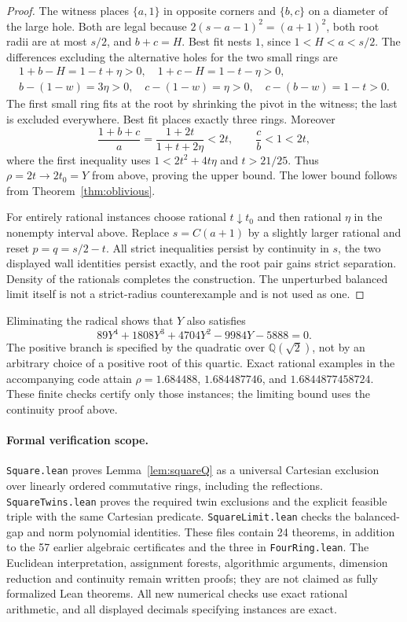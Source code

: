 \begin{proof}
The witness places $\{a,1\}$ in opposite corners and $\{b,c\}$
on a diameter of the large hole. Both are legal because
$2(s-a-1)^2=(a+1)^2$, both root radii are at most $s/2$, and
$b+c=H$. Best fit nests $1$, since $1<H<a<s/2$.
The differences excluding the alternative holes for the two
small rings are
\begin{gather*}
 1+b-H=1-t+\eta>0,\quad 1+c-H=1-t-\eta>0,\\
 b-(1-w)=3\eta>0,\quad c-(1-w)=\eta>0,\quad
 c-(b-w)=1-t>0.
\end{gather*}
The first small ring fits at the root by shrinking the pivot in
the witness; the last is excluded everywhere. Best fit places
exactly three rings. Moreover
\[
 \frac{1+b+c}{a}=\frac{1+2t}{1+t+2\eta}<2t,
 \qquad \frac cb<1<2t,
\]
where the first inequality uses $1<2t^2+4t\eta$ and $t>21/25$.
Thus $\rho=2t\to2t_0=Y$ from above, proving the upper bound.
The lower bound follows from Theorem~\ref{thm:oblivious}.

For entirely rational instances choose rational $t\downarrow t_0$
and then rational $\eta$ in the nonempty interval above. Replace
$s=C(a+1)$ by a slightly larger rational and reset $p=q=s/2-t$.
All strict inequalities persist by continuity in $s$, the two
displayed wall identities persist exactly, and the root pair gains
strict separation. Density of the rationals completes the construction.
The unperturbed balanced limit itself is not a strict-radius
counterexample and is not used as one.
\end{proof}

Eliminating the radical shows that $Y$ also satisfies
\[
 89Y^4+1808Y^3+4704Y^2-9984Y-5888=0.
\]
The positive branch is specified by the quadratic over $\mathbb Q(\sqrt2)$,
not by an arbitrary choice of a positive root of this quartic.
Exact rational examples in the accompanying code attain
$\rho=1.684488$, $1.684487746$, and $1.6844877458724$.
These finite checks certify only those instances; the limiting bound
uses the continuity proof above.

\paragraph{Formal verification scope.}
\texttt{Square.lean} proves Lemma~\ref{lem:squareQ} as a universal
Cartesian exclusion over linearly ordered commutative rings, including
the reflections. \texttt{SquareTwins.lean} proves the required twin
exclusions and the explicit feasible triple with the same Cartesian
predicate. \texttt{SquareLimit.lean} checks the balanced-gap and norm
polynomial identities. These files contain 24 theorems, in addition
to the 57 earlier algebraic certificates and the three in
\texttt{FourRing.lean}. The Euclidean interpretation,
assignment forests, algorithmic arguments, dimension reduction and
continuity remain written proofs; they are not claimed as fully
formalized Lean theorems. All new numerical checks use exact rational
arithmetic, and all displayed decimals specifying instances are exact.
